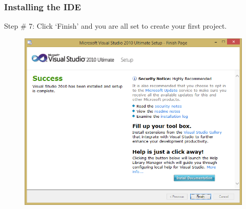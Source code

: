\documentclass{beamer}
\begin{document}
\begin{frame}
    \frametitle{Installing the IDE}
    Step \# 7: Click `Finish' and you are all set to create your first project.
    \begin{figure}
        \centering
        \includegraphics[scale=0.39]{step_6}
    \end{figure}
\end{frame}
\end{document}
